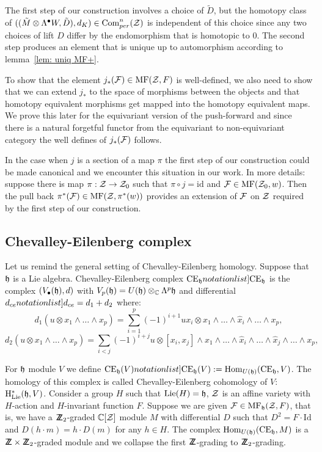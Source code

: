 The first step of our construction involves a choice of $\tilde{D}$,  but the homotopy class of  $((\tilde{M}\otimes\Lambda^\bullet W,\tilde{D}),d_K)\in \mathrm{Com}_{per}^n(\mathcal{Z})$ is independent of this choice since
any two choices of lift $D$ differ by the  endomorphism that is homotopic to $0$. The second step produces an element that is unique up to automorphism according to lemma~\ref{lem: uniq MF+}.

To show that  the element $j_*(\mathcal{F})\in \mathrm{MF}(\mathcal{Z},F)$ is well-defined,  we also need to show that we can extend $j_*$ to the space of morphisms between the objects and that
homotopy equivalent morphisms get mapped into the homotopy equivalent maps. We prove this later for the equivariant version of the push-forward and since there is a natural forgetful functor from the
equivariant to non-equivariant category the well defines of $j_*(\mathcal{F})$ follows.

\begin{remark} \label{rem: section} In the case when $j$ is a section of a  map \(\pi\) the first step of our construction could be made canonical and  we encounter this situation in our work. In more details: suppose there is map
 $\pi:\mathcal{Z}\to \mathcal{Z}_0$ such that $\pi\circ j=\mathrm{id}$ and $\mathcal{F}\in \mathrm{MF}(\mathcal{Z}_0,w)$. Then the pull back $\pi^*(\mathcal{F})\in \mathrm{MF}(\mathcal{Z},\pi^*(w))$ provides an extension of $\mathcal{F}$ on $\mathcal{Z}$ required by the
 first step of our construction.
\end{remark}

 \subsection{Chevalley-Eilenberg complex} Let us remind the general setting of Che\-val\-ley-Eilenberg homology. Suppose that $\mathfrak{h}$ is a Lie algebra. Chevalley-Eilenberg complex
 $\SymbolPrint{\CE_\frh}$ is the complex $(V_\bullet(\mathfrak{h}),d)$ with $V_p(\mathfrak{h})=U(\mathfrak{h})\otimes_{\mathbb{C}}\Lambda^p \mathfrak{h}$ and differential $\SymbolPrint{d_{ce}}=d_1+d_2$ where:
 \def\dtheta{d}
 $$ d_1(u\otimes x_1\wedge\dots \wedge x_p)=\sum_{i=1}^p (-1)^{i+1} ux_i\otimes x_1\wedge\dots \wedge \hat{x}_i\wedge\dots\wedge x_p,$$
 $$ d_2(u\otimes x_1\wedge\dots \wedge x_p)=\sum_{i<j} (-1)^{i+j} u\otimes [x_i,x_j]\wedge x_1\wedge\dots \wedge \hat{x}_i\wedge\dots\wedge \hat{x}_j\wedge\dots \wedge x_p,$$

 For $\mathfrak{h}$ module $V$ we define $\SymbolPrint{\CE_\frh(V)}:=\Hom_{U(\frh)}(\CE_\frh,V)$. The homology of this complex is called Chevalley-Eilenberg cohomology of $V$: $\mathrm{H}^*_{\mathrm{Lie}}(\mathfrak{h},V)$.
  Consider a group $H$ such that $\mathrm{Lie}(H)=\mathfrak{h}$, $\mathcal{Z}$ is an affine variety with $H$-action and $H$-invariant function $F$.
 Suppose we  are given $\mathcal{F}\in \mathrm{MF}_{\mathfrak{h}}(\mathcal{Z},F)$, that is, we have a $\relax{\sf Z\kern-.4em Z}_2$-graded $\mathbb{C}[\mathcal{Z}]$ module $M$ with differential $D$ such that $D^2=F\cdot \mathrm{Id}$ and
 $D(h\cdot m)=h\cdot D(m)$ for any $h\in H$. The complex $\mathop{{\rm Hom}}\nolimits_{U(\mathfrak{h})}(\mathrm{CE}_{\mathfrak{h}},M)$ is a $\relax{\sf Z\kern-.4em Z}\times \relax{\sf Z\kern-.4em Z}_2$-graded module and we collapse the first
 $\relax{\sf Z\kern-.4em Z}$-grading to $\relax{\sf Z\kern-.4em Z}_2$-grading.

